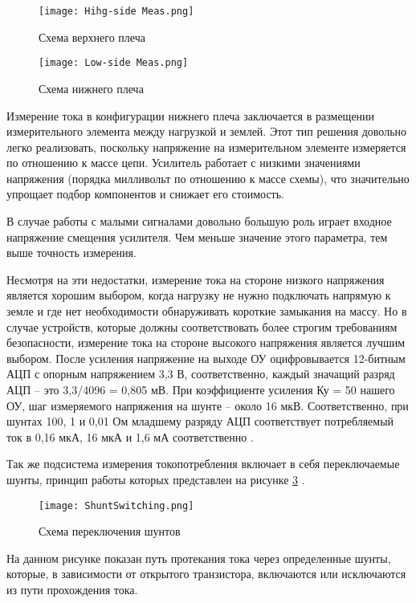 \begin{figure}[H]
  \centering
  \texttt{[image: Hihg-side Meas.png]}
  \caption{Схема верхнего плеча}
  \label{ris:231}
\end{figure}

\begin{figure}[H]
  \centering
  \texttt{[image: Low-side Meas.png]}
  \caption{Схема нижнего плеча}
  \label{ris:232}
\end{figure}

Измерение тока в конфигурации нижнего плеча заключается в размещении измерительного 
элемента между нагрузкой и землей. Этот тип решения довольно легко реализовать, поскольку 
напряжение на измерительном элементе измеряется по отношению к массе цепи. Усилитель 
работает с низкими значениями напряжения (порядка милливольт по отношению к массе схемы), 
что значительно упрощает подбор компонентов и снижает его стоимость.

В случае работы с малыми сигналами довольно большую роль играет входное напряжение 
смещения усилителя. Чем меньше значение этого параметра, тем выше точность измерения.

Несмотря на эти недостатки, измерение тока на стороне низкого напряжения является хорошим выбором,
когда нагрузку не нужно подключать напрямую к земле и где нет необходимости обнаруживать 
короткие замыкания на массу. Но в случае устройств, которые должны соответствовать 
более строгим требованиям безопасности, измерение тока на стороне высокого 
напряжения является лучшим выбором.
После усиления напряжение на выходе ОУ оцифровывается 12-битным АЦП с опорным 
напряжением 3,3 В, соответственно, каждый значащий разряд АЦП -- это 3,3/4096 = 0,805 мВ.
При коэффициенте усиления Ку = 50 нашего ОУ, шаг измеряемого напряжения
на шунте -- около 16 мкВ. Соответственно, при шунтах 100, 1 и 0,01 Ом младшему 
разряду АЦП соответствует потребляемый ток в 0,16 мкА, 16 мкА и 1,6 мА соответственно 
\cite{GooglePatent:1}.

Так же подсистема измерения токопотребления включает в себя переключаемые шунты, принцип работы которых 
представлен на рисунке \ref{ris:ShuntSwitching} \cite{GooglePatent:2}.

\begin{figure}[H]
  \centering
  \texttt{[image: ShuntSwitching.png]}
  \caption{Схема переключения шунтов}
  \label{ris:ShuntSwitching}
\end{figure}

На данном рисунке показан путь протекания тока через определенные шунты, которые, в зависимости от 
открытого транзистора, включаются или исключаются из пути прохождения тока. 



